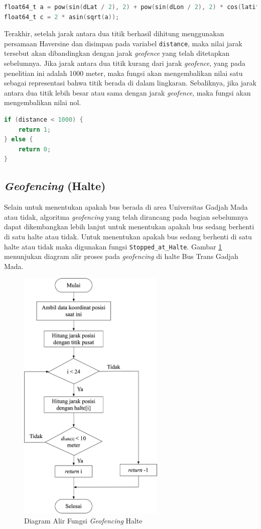 \begin{lstlisting}[language=c]
float64_t a = pow(sin(dLat / 2), 2) + pow(sin(dLon / 2), 2) * cos(latitude) * cos(longitude);
float64_t c = 2 * asin(sqrt(a));
\end{lstlisting}

Terakhir, setelah jarak antara dua titik berhasil dihitung menggunakan persamaan Haversine dan disimpan pada variabel \texttt{distance}, maka nilai jarak tersebut akan dibandingkan dengan jarak \textit{geofence} yang telah ditetapkan sebelumnya. Jika jarak antara dua titik kurang dari jarak \textit{geofence}, yang pada penelitian ini adalah 1000 meter, maka fungsi akan mengembalikan nilai satu sebagai representasi bahwa titik berada di dalam lingkaran. Sebaliknya, jika jarak antara dua titik lebih besar atau sama dengan jarak \textit{geofence}, maka fungsi akan mengembalikan nilai nol.

\begin{lstlisting}[language=c]
 if (distance < 1000) {
	return 1;
} else {
	return 0;
}
\end{lstlisting}

\subsection{\textit{Geofencing} (Halte)}
Selain untuk menentukan apakah bus berada di area Universitas Gadjah Mada atau tidak, algoritma \textit{geofencing} yang telah dirancang pada bagian sebelumnya dapat dikembangkan lebih lanjut untuk menentukan apakah bus sedang berhenti di satu halte atau tidak. Untuk menentukan apakah bus sedang berhenti di satu halte atau tidak maka digunakan fungsi \texttt{Stopped\_at\_Halte}. Gambar \ref{Fig: flowchart-geofencing-halte} menunjukan diagram alir proses pada \textit{geofencing} di halte Bus Trans Gadjah Mada. 

\begin{figure}[H]
	\centering
	\includegraphics[width=7cm]{contents/chapter-3/flowchart-geofencing-halte.png}
	\caption{Diagram Alir Fungsi \textit{Geofencing} Halte}
	\label{Fig: flowchart-geofencing-halte}
\end{figure}


